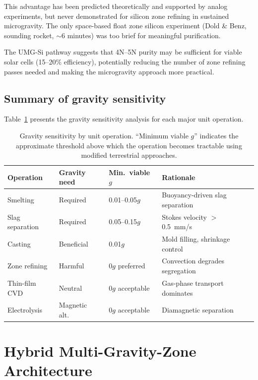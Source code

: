 \documentclass[preprint,12pt]{elsarticle}
\begin{document}
This advantage has been predicted theoretically and supported by analog experiments, but never demonstrated for silicon zone refining in sustained microgravity. The only space-based float zone silicon experiment (Dold \& Benz, sounding rocket, $\sim$6 minutes) was too brief for meaningful purification.

The UMG-Si pathway \cite{fornies2021} suggests that 4N--5N purity may be sufficient for viable solar cells (15--20\% efficiency), potentially reducing the number of zone refining passes needed and making the microgravity approach more practical.

\subsection{Summary of gravity sensitivity}

Table~\ref{tab:gravity-sensitivity} presents the gravity sensitivity analysis for each major unit operation.

\begin{table}[ht]
\centering
\caption{Gravity sensitivity by unit operation. ``Minimum viable $g$'' indicates the approximate threshold above which the operation becomes tractable using modified terrestrial approaches.}
\label{tab:gravity-sensitivity}
\begin{tabular}{lllp{4.5cm}}
\toprule
\textbf{Operation} & \textbf{Gravity need} & \textbf{Min.\ viable $g$} & \textbf{Rationale} \\
\midrule
Smelting & Required & 0.01--0.05$g$ & Buoyancy-driven slag separation \\
Slag separation & Required & 0.05--0.15$g$ & Stokes velocity $>$ 0.5~mm/s \\
Casting & Beneficial & 0.01$g$ & Mold filling, shrinkage control \\
Zone refining & Harmful & 0$g$ preferred & Convection degrades segregation \\
Thin-film CVD & Neutral & 0$g$ acceptable & Gas-phase transport dominates \\
Electrolysis & Magnetic alt.\ & 0$g$ acceptable & Diamagnetic separation \cite{akay2025} \\
\bottomrule
\end{tabular}
\end{table}

\section{Hybrid Multi-Gravity-Zone Architecture}
\label{sec:architecture}
\end{document}
